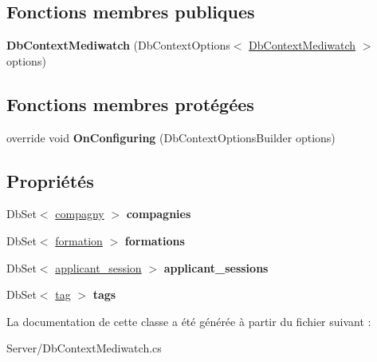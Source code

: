 \subsection*{Fonctions membres publiques}
\begin{DoxyCompactItemize}
\item 
\mbox{\label{class_server_1_1_db_context_mediwatch_a94fde86883fe0a2d1ce0b4c58f06727f}} 
{\bfseries Db\+Context\+Mediwatch} (Db\+Context\+Options$<$ \hyperlink{class_server_1_1_db_context_mediwatch}{Db\+Context\+Mediwatch} $>$ options)
\end{DoxyCompactItemize}
\subsection*{Fonctions membres protégées}
\begin{DoxyCompactItemize}
\item 
\mbox{\label{class_server_1_1_db_context_mediwatch_a72073ff88f3990c4792f85688f55f073}} 
override void {\bfseries On\+Configuring} (Db\+Context\+Options\+Builder options)
\end{DoxyCompactItemize}
\subsection*{Propriétés}
\begin{DoxyCompactItemize}
\item 
\mbox{\label{class_server_1_1_db_context_mediwatch_a068d9222b8448c069c2d181a9f577d0c}} 
Db\+Set$<$ \hyperlink{class_server_1_1_models_1_1compagny}{compagny} $>$ {\bfseries compagnies}
\item 
\mbox{\label{class_server_1_1_db_context_mediwatch_a6597dab2848cd5aa87774af4bf6eb4e4}} 
Db\+Set$<$ \hyperlink{class_server_1_1_models_1_1formation}{formation} $>$ {\bfseries formations}
\item 
\mbox{\label{class_server_1_1_db_context_mediwatch_aea8aaf9d1c1f27f64a2a488f41c531b2}} 
Db\+Set$<$ \hyperlink{class_server_1_1_models_1_1applicant__session}{applicant\+\_\+session} $>$ {\bfseries applicant\+\_\+sessions}
\item 
\mbox{\label{class_server_1_1_db_context_mediwatch_a0bcaba8827c3d82857deb35923f6dcef}} 
Db\+Set$<$ \hyperlink{class_server_1_1_models_1_1tag}{tag} $>$ {\bfseries tags}
\end{DoxyCompactItemize}


La documentation de cette classe a été générée à partir du fichier suivant \+:\begin{DoxyCompactItemize}
\item 
Server/Db\+Context\+Mediwatch.\+cs\end{DoxyCompactItemize}
